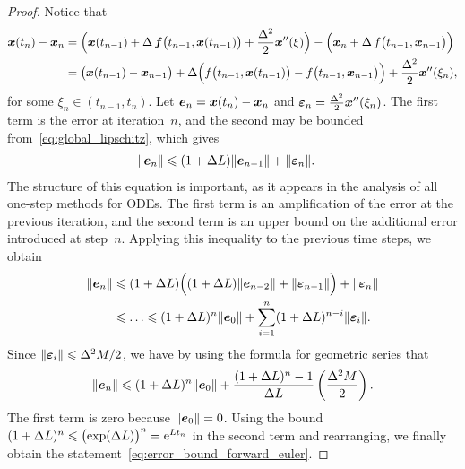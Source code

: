\begin{proof}
    Notice that
    \begin{align*}
        \label{eq:error_propagation}
        \mathbf{\boldsymbol{x}}(t_{n}) - \mathbf{\boldsymbol{x}}_{n}
        &= \Bigl( \mathbf{\boldsymbol{x}}(t_{n-1}) + \Delta \, \mathbf{\boldsymbol{f}}\bigl(t_{n-1}, \mathbf{\boldsymbol{x}}(t_{n-1})\bigr) + \frac{\Delta^2}{2} \mathbf{\boldsymbol{x}}''(\xi) \Bigr)
        - \Bigl( \mathbf{\boldsymbol{x}}_n + \Delta \, f\bigl(t_{n-1}, \mathbf{\boldsymbol{x}}_{n-1}\bigr) \Bigr) \\
        &= \bigl(\mathbf{\boldsymbol{x}}(t_{n-1}) - \mathbf{\boldsymbol{x}}_{n-1}\bigr) + \Delta \Bigl( f\bigl(t_{n-1}, \mathbf{\boldsymbol{x}}(t_{n-1})\bigr) - f\bigl(t_{n-1}, \mathbf{\boldsymbol{x}}_{n-1}\bigr) \Bigr) + \frac{\Delta^2}{2} \mathbf{\boldsymbol{x}}''(\xi_n),
    \end{align*}
    for some $\xi_n \in (t_{n-1}, t_n)$.
    Let $\mathbf{\boldsymbol{e}}_n = \mathbf{\boldsymbol{x}}(t_n) - \mathbf{\boldsymbol{x}}_n$ and $\mathbf{\boldsymbol{\varepsilon}}_n = \frac{\Delta^2}{2} \mathbf{\boldsymbol{x}}''(\xi_n)$.
    The first term is the error at iteration~$n$,
    and the second may be bounded from~\eqref{eq:global_lipschitz},
    which gives
    \begin{align*}
        \lVert\mathbf{\boldsymbol{e}}_{n}\rVert
        &\leqslant (1 + \Delta L) \lVert\mathbf{\boldsymbol{e}}_{n-1}\rVert
        + \lVert\mathbf{\boldsymbol{\varepsilon}}_n\rVert.
    \end{align*}
    The structure of this equation is important,
    as it appears in the analysis of all one-step methods for ODEs.
    The first term is an amplification of the error at the previous iteration,
    and the second term is an upper bound on the additional error introduced at step~$n$.
    Applying this inequality to the previous time steps, we obtain
    \begin{align*}
        \lVert\mathbf{\boldsymbol{e}}_{n}\rVert
        &\leqslant (1 + \Delta L) \Bigl( (1 + \Delta L) \lVert\mathbf{\boldsymbol{e}}_{n-2}\rVert + \lVert\mathbf{\boldsymbol{\varepsilon}}_{n-1}\rVert \Bigr) + \lVert\mathbf{\boldsymbol{\varepsilon}}_{n}\rVert \\
        &\leqslant \dotsc
        \leqslant (1 + \Delta L)^{n} \lVert\mathbf{\boldsymbol{e}}_{0}\rVert + \sum_{i=1}^{n} (1 + \Delta L)^{n-i} \lVert\mathbf{\boldsymbol{\varepsilon}}_{i}\rVert.
    \end{align*}
    Since $\lVert\mathbf{\boldsymbol{\varepsilon}}_i\rVert \leqslant \Delta^2M/2$,
    we have by using the formula for geometric series that
    \[
        \lVert\mathbf{\boldsymbol{e}}_{n}\rVert
        \leqslant (1 + \Delta L)^{n} \lVert\mathbf{\boldsymbol{e}}_{0}\rVert + \frac{(1+\Delta L)^{n} - 1}{\Delta L} \left( \frac{\Delta^2 M}{2} \right).
    \]
    The first term is zero because $\lVert\mathbf{\boldsymbol{e}}_{0}\rVert = 0$.
    Using the bound $(1+\Delta L)^n \leqslant \bigl(\exp(\Delta L)\bigr)^n = \mathrm e^{L t_n}$ in the second term and rearranging,
    we finally obtain the statement~\eqref{eq:error_bound_forward_euler}.
\end{proof}

